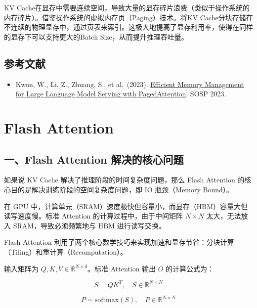 KV Cache在显存中需要连续空间，导致大量的显存碎片浪费（类似于操作系统的内存碎片）。借鉴操作系统的虚拟内存页（Paging）技术。将KV Cache分块存储在不连续的物理显存中，通过页表来索引。这极大地提高了显存利用率，使得在同样的显存下可以支持更大的Batch Size，从而提升推理吞吐量。

\hypertarget{ux53c2ux8003ux6587ux732e-90}{%
\subsection{参考文献}\label{ux53c2ux8003ux6587ux732e-90}}

\begin{itemize}
\tightlist
\item
  Kwon, W., Li, Z., Zhuang, S., et al.~(2023). \href{https://arxiv.org/abs/2309.06180}{Efficient Memory Management for Large Language Model Serving with PagedAttention}. SOSP 2023.
\end{itemize}

\clearpage

\hypertarget{flash-attention}{%
\section{Flash Attention}\label{flash-attention}}

\hypertarget{ux4e00flash-attention-ux89e3ux51b3ux7684ux6838ux5fc3ux95eeux9898}{%
\subsection{一、Flash Attention 解决的核心问题}\label{ux4e00flash-attention-ux89e3ux51b3ux7684ux6838ux5fc3ux95eeux9898}}

如果说 KV Cache 解决了推理阶段的时间复杂度问题，那么 Flash Attention 的核心目的是解决训练阶段的空间复杂度问题，即 IO 瓶颈（Memory Bound）。

在 GPU 中，计算单元（SRAM）速度极快但容量小，而显存（HBM）容量大但读写速度慢。标准 Attention 的计算过程中，由于中间矩阵 \(N \times N\) 太大，无法放入 SRAM，导致必须频繁地与 HBM 进行读写交换。

Flash Attention 利用了两个核心数学技巧来实现加速和显存节省：分块计算（Tiling）和重计算（Recomputation）。

输入矩阵为 \(Q,K,V \in \mathbb{R}^{N \times d}\)。标准 Attention 输出 \(O\) 的计算公式为：

\[
S = QK^T,\quad S \in \mathbb{R}^{N \times N}
\]

\[
P = \mathrm{softmax}(S),\quad P \in \mathbb{R}^{N \times N}
\]

